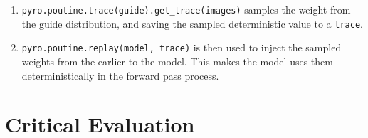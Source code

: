 \documentclass[ %
                    author={Revalda Putawara},
                supervisor={Dr. James Pope},
                    degree={MSc},
                     title={Robustness of Bayesian Neural Networks Design Choices Against Weight and Bias Perturbation Induced by Single Event Upsets (SEUs)},
                      type={},
                      year={2025}]{dissertation}
\begin{document}
\begin{enumerate}
\item \texttt{pyro.poutine.trace(guide).get\_trace(images)} samples the weight from the guide distribution, and saving the sampled deterministic value to a \texttt{trace}.
\item \texttt{pyro.poutine.replay(model, trace)} is then used to inject the sampled weights from the earlier to the model. This makes the model uses them deterministically in the forward pass process.
\end{enumerate}

\chapter{Critical Evaluation}
\label{chap:evaluation}
\end{document}
